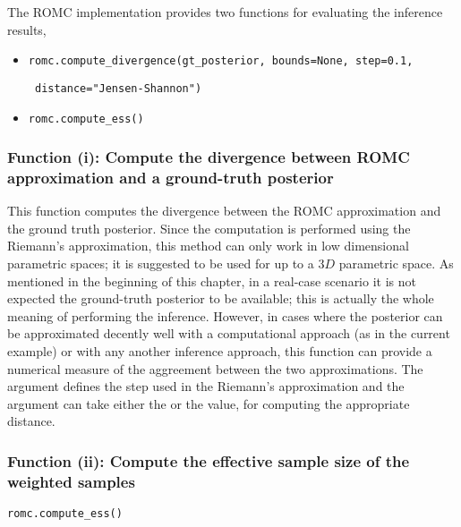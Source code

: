 The ROMC implementation provides two functions for evaluating the inference results,

\begin{itemize}
\item \texttt{romc.compute_divergence(gt_posterior, bounds=None, step=0.1,}

      \texttt{                        distance="Jensen-Shannon")}

\item \texttt{romc.compute_ess()}
\end{itemize}

\subsubsection*{Function (i): Compute the divergence between ROMC approximation and a ground-truth posterior}


\vspace{5mm}

\noindent
This function computes the divergence between the ROMC approximation
and the ground truth posterior. Since the computation is performed
using the Riemann's approximation, this method can only work in low
dimensional parametric spaces; it is suggested to be used for up to a
$3D$ parametric space. As mentioned in the beginning of this chapter,
in a real-case scenario it is not expected the ground-truth posterior
to be available; this is actually the whole meaning of performing the
inference. However, in cases where the posterior can be approximated
decently well with a computational approach (as in the current
example) or with any another inference approach, this function can
provide a numerical measure of the aggreement between the two
approximations. The argument  defines the step used in the
Riemann's approximation and the argument  can take
either the  or the 
value, for computing the appropriate distance.

\subsubsection*{Function (ii): Compute the effective sample size of the weighted samples}

\texttt{romc.compute_ess()}
\vspace{5mm}

